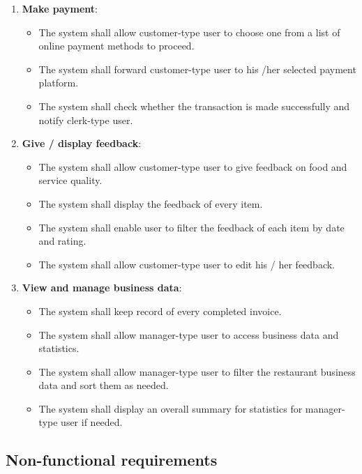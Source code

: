\documentclass[12pt, a4paper]{article}
\theoremstyle{styleth}
\theoremstyle{styledef}
\begin{document}
\begin{enumerate}[label=\alph*., font=\itshape]
	\item \textbf{Make payment}:
	\begin{itemize}
		\item The system shall allow customer-type user to choose one from a list of online payment methods to proceed.
		\item The system shall forward customer-type user to his /her selected payment platform.
		\item The system shall check whether the transaction is made successfully and notify clerk-type user.
	\end{itemize}

	\item \textbf{Give / display feedback}:
	\begin{itemize}
		\item The system shall allow customer-type user to give feedback on food and service quality.
		\item The system shall display the feedback of every item.
		\item The system shall enable user to filter the feedback of each item by date and rating.
		\item The system shall allow customer-type user to edit his / her feedback.
	\end{itemize}

	\item \textbf{View and manage business data}:
	\begin{itemize}
		\item The system shall keep record of every completed invoice.
		\item The system shall allow manager-type user to access business data and statistics.
		\item The system shall allow manager-type user to filter the restaurant business	data and sort them as needed.
		\item The system shall display an overall summary for statistics for manager-type user if needed.
	\end{itemize}
\end{enumerate}

\subsection{Non-functional requirements}
\end{document}
